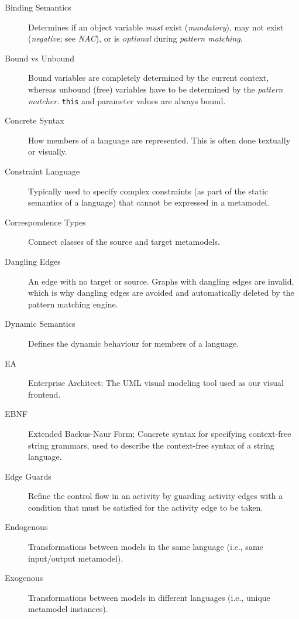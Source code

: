 \begin{description}
\item[Binding Semantics] %
Determines if an object variable \emph{must} exist (\emph{mandatory}), may not exist (\emph{negative}; see \emph{NAC}), or is \emph{optional} during
\emph{pattern matching}.

\item[Bound vs Unbound] %
Bound variables are completely determined by the current context, whereas unbound (free) variables have to be determined by the \emph{pattern matcher}.
\texttt{this} and parameter values are always bound.

\item[Concrete Syntax] %
How members of a language are represented. This is often done textually or visually.

\item[Constraint Language] %
Typically used to specify complex constraints (as part of the static semantics of a language) that cannot be expressed in a metamodel.

\item[Correspondence Types] %
Connect classes of the source and target metamodels.

\item[Dangling Edges] %
An edge with no target or source. Graphs with dangling edges are invalid, which is why dangling edges are avoided and automatically deleted by the pattern
matching engine.

\item[Dynamic Semantics] %
Defines the dynamic behaviour for members of a language.

\item[EA] %
Enterprise Architect; The UML visual modeling tool used as our visual frontend.

\item[EBNF] %
Extended Backus-Naur Form; Concrete syntax for specifying con\-text-free string grammars, used to describe the context-free syntax of a string
language.

\item[Edge Guards] %
Refine the control flow in an activity by guarding activity edges with a condition that must be satisfied for the activity edge to be taken.

\item[Endogenous] %
Transformations between models in the same language (i.e., same input/output metamodel). 
 
\item[Exogenous] %
Transformations between models in different languages (i.e., unique metamodel instances). 


\end{description}
